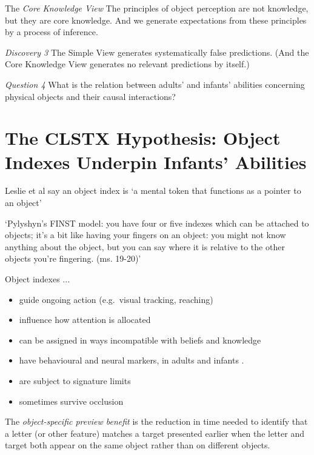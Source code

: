 \documentclass[12pt]{extarticle}
\begin{document}
\begin{multicols}{3}
The \emph{Core Knowledge View}
The principles of object perception are not
knowledge, but they are core knowledge. And we generate expectations from
these principles by a process of inference.

\emph{Discovery 3} The Simple View generates systematically false predictions.
(And the Core Knowledge View generates no relevant predictions by itself.)

\emph{Question 4} What is the relation between adults’ and infants’ abilities concerning physical
objects and their causal interactions?



\section{The CLSTX Hypothesis: Object Indexes Underpin Infants’ Abilities}

Leslie et al say an object index is ‘a mental token that functions as a pointer to an
object’ \citep[p.\ 11]{Leslie:1998zk}

‘Pylyshyn’s FINST model: you have four or five indexes which can be attached to objects;
it’s a bit like having your fingers on an object: you might not know anything about the
object, but you can say where it is relative to the other objects you’re fingering.
(ms. 19-20)’ \citep{Scholl:1999mi}

Object indexes ...
\begin{itemize}
\item guide ongoing action (e.g.~visual tracking, reaching)
\item influence how attention is allocated
\citep{flombaum:2008_attentional}
\item can be assigned in ways incompatible with beliefs and knowledge \citep[e.g.][]{Mitroff:2004pc, mitroff:2007_space}
\item have behavioural  and neural markers, in adults and infants   \citep{richardson:2004_multimodal,kaufman:2005_oscillatory}.
\item are subject to signature limits \citep[pp.~83--87]{carey:2009_origin}
\item sometimes survive occlusion \citep{flombaum:2006_temporal}
\end{itemize}

The \emph{object-specific preview benefit} is the reduction in time needed to identify that a
letter (or other feature) matches a target presented earlier when the letter and target both
appear on the same object rather than on different objects.



\end{multicols}
\end{document}
